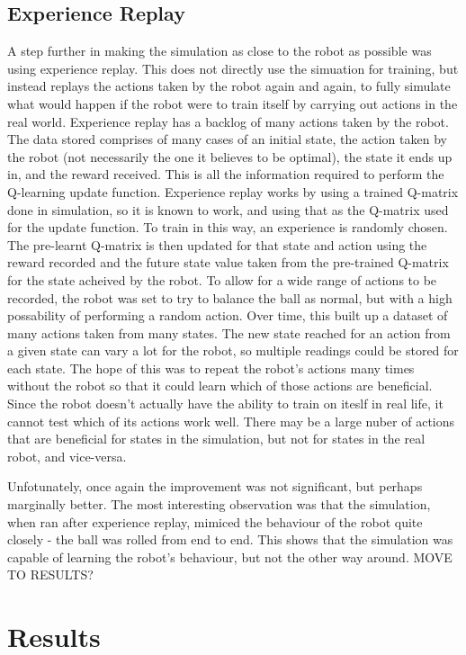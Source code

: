 \documentclass[12pt,a4paper]{article}
\begin{document}
\subsection{Experience Replay}
A step further in making the simulation as close to the robot as possible was using experience replay. This does not directly use the simuation for training, but instead replays the actions taken by the robot again and again, to fully simulate what would happen if the robot were to train itself by carrying out actions in the real world. Experience replay has a backlog of many actions taken by the robot. The data stored comprises of many cases of an initial state, the action taken by the robot (not necessarily the one it believes to be optimal), the state it ends up in, and the reward received. This is all the information required to perform the Q-learning update function. Experience replay works by using a trained Q-matrix done in simulation, so it is known to work, and using that as the Q-matrix used for the update function. To train in this way, an experience is randomly chosen. The pre-learnt Q-matrix is then updated for that state and action using the reward recorded and the future state value taken from the pre-trained Q-matrix for the state acheived by the robot. To allow for a wide range of actions to be recorded, the robot was set to try to balance the ball as normal, but with a high possability of performing a random action. Over time, this built up a dataset of many actions taken from many states. The new state reached for an action from a given state can vary a lot for the robot, so multiple readings could be stored for each state. The hope of this was to repeat the robot's actions many times without the robot so that it could learn which of those actions are beneficial. Since the robot doesn't actually have the ability to train on iteslf in real life, it cannot test which of its actions work well. There may be a large nuber of actions that are beneficial for states in the simulation, but not for states in the real robot, and vice-versa. 

Unfotunately, once again the improvement was not significant, but perhaps marginally better. The most interesting observation was that the simulation, when ran after experience replay, mimiced the behaviour of the robot quite closely - the ball was rolled from end to end. This shows that the simulation was capable of learning the robot's behaviour, but not the other way around. MOVE TO RESULTS?

\section{Results}
\end{document}
